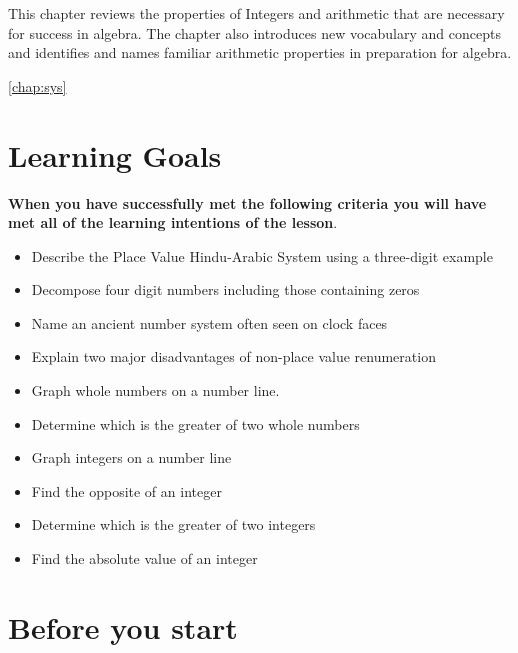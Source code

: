 





This chapter reviews the properties of Integers and arithmetic that are
necessary for success in algebra. The chapter also introduces new vocabulary and concepts  and identifies and names familiar arithmetic
properties in preparation for algebra.

\eqref{chap:sys}
\section{Learning Goals}
\begin{tcolorbox}
 \textbf{When you have successfully met the following criteria you will have met all of the learning intentions of the lesson}.
\tcblower
\begin{itemize}
\item Describe the Place Value  Hindu-Arabic System using a three-digit example
\item Decompose   four digit numbers including those containing zeros
\item Name an ancient number system often seen on clock faces
\item Explain two major disadvantages of non-place value renumeration
    \item Graph whole numbers on a number line.
   \item Determine which is the greater of two whole numbers
   \item Graph integers on a number line
   \item Find the opposite of an integer
   \item Determine which is the greater of two integers
   \item Find the absolute value of an integer
\end{itemize}
\end{tcolorbox}



\section{Before you start}





